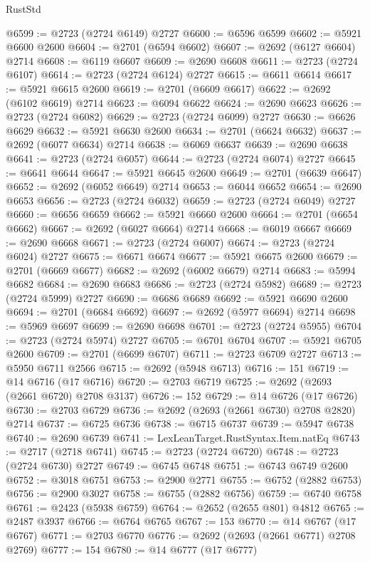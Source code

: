 \begin{lexlean}{RustStd}
\begin{coremodule}
{\begin{coremodule}
{{{{{{{{{{{{{{{{{{{{{{{{{{{{{{{{{{{{{{{@6599 := @2723 (@2724 @6149) @2727
@6600 := @6596 @6599
@6602 := @5921 @6600 @2600
@6604 := @2701 (@6594 @6602)
@6607 := @2692 (@6127 @6604) @2714
@6608 := @6119 @6607
@6609 := @2690 @6608
@6611 := @2723 (@2724 @6107)
@6614 := @2723 (@2724 @6124) @2727
@6615 := @6611 @6614
@6617 := @5921 @6615 @2600
@6619 := @2701 (@6609 @6617)
@6622 := @2692 (@6102 @6619) @2714
@6623 := @6094 @6622
@6624 := @2690 @6623
@6626 := @2723 (@2724 @6082)
@6629 := @2723 (@2724 @6099) @2727
@6630 := @6626 @6629
@6632 := @5921 @6630 @2600
@6634 := @2701 (@6624 @6632)
@6637 := @2692 (@6077 @6634) @2714
@6638 := @6069 @6637
@6639 := @2690 @6638
@6641 := @2723 (@2724 @6057)
@6644 := @2723 (@2724 @6074) @2727
@6645 := @6641 @6644
@6647 := @5921 @6645 @2600
@6649 := @2701 (@6639 @6647)
@6652 := @2692 (@6052 @6649) @2714
@6653 := @6044 @6652
@6654 := @2690 @6653
@6656 := @2723 (@2724 @6032)
@6659 := @2723 (@2724 @6049) @2727
@6660 := @6656 @6659
@6662 := @5921 @6660 @2600
@6664 := @2701 (@6654 @6662)
@6667 := @2692 (@6027 @6664) @2714
@6668 := @6019 @6667
@6669 := @2690 @6668
@6671 := @2723 (@2724 @6007)
@6674 := @2723 (@2724 @6024) @2727
@6675 := @6671 @6674
@6677 := @5921 @6675 @2600
@6679 := @2701 (@6669 @6677)
@6682 := @2692 (@6002 @6679) @2714
@6683 := @5994 @6682
@6684 := @2690 @6683
@6686 := @2723 (@2724 @5982)
@6689 := @2723 (@2724 @5999) @2727
@6690 := @6686 @6689
@6692 := @5921 @6690 @2600
@6694 := @2701 (@6684 @6692)
@6697 := @2692 (@5977 @6694) @2714
@6698 := @5969 @6697
@6699 := @2690 @6698
@6701 := @2723 (@2724 @5955)
@6704 := @2723 (@2724 @5974) @2727
@6705 := @6701 @6704
@6707 := @5921 @6705 @2600
@6709 := @2701 (@6699 @6707)
@6711 := @2723 @6709 @2727
@6713 := @5950 @6711 @2566
@6715 := @2692 (@5948 @6713)
@6716 := 151
@6719 := @14 @6716 (@17 @6716)
@6720 := @2703 @6719
@6725 := @2692 (@2693 (@2661 @6720) @2708 @3137)
@6726 := 152
@6729 := @14 @6726 (@17 @6726)
@6730 := @2703 @6729
@6736 := @2692 (@2693 (@2661 @6730) @2708 @2820) @2714
@6737 := @6725 @6736
@6738 := @6715 @6737
@6739 := @5947 @6738
@6740 := @2690 @6739
@6741 := LexLeanTarget.RustSyntax.Item.natEq
@6743 := @2717 (@2718 @6741)
@6745 := @2723 (@2724 @6720)
@6748 := @2723 (@2724 @6730) @2727
@6749 := @6745 @6748
@6751 := @6743 @6749 @2600
@6752 := @3018 @6751
@6753 := @2900 @2771
@6755 := @6752 (@2882 @6753)
@6756 := @2900 @3027
@6758 := @6755 (@2882 @6756)
@6759 := @6740 @6758
@6761 := @2423 (@5938 @6759)
@6764 := @2652 (@2655 @801) @4812
@6765 := @2487 @3937
@6766 := @6764 @6765
@6767 := 153
@6770 := @14 @6767 (@17 @6767)
@6771 := @2703 @6770
@6776 := @2692 (@2693 (@2661 @6771) @2708 @2769)
@6777 := 154
@6780 := @14 @6777 (@17 @6777)
}}}}}}}}}}}}}}}}}}}}}}}}}}}}}}}}}}}}}}}
\end{coremodule}}
\end{coremodule}
\end{lexlean}

